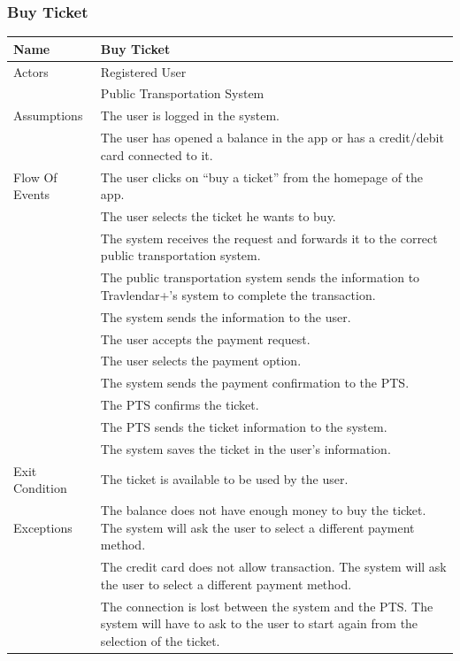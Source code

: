 \documentclass{article}
\begin{document}
\subsubsection{Buy Ticket}
\begin{center}
\begin{tabular}{| p{3cm} || p{8cm} |}
\hline
Name & Buy Ticket \\ \hline
Actors & Registered User \\&Public Transportation System \\ \hline
Assumptions &The user is logged in the system.\\&The user has opened a balance in the app or has a credit/debit card connected to it. \\ \hline
Flow Of Events &The user clicks on “buy a ticket” from the homepage of the app.\\&
The user selects the ticket he wants to buy.\\&
The system receives the request and forwards it to the correct public transportation system.\\&
The public transportation system sends the information to Travlendar+’s system to complete the transaction.\\&
The system sends the information to the user.\\&
The user accepts the payment request.\\&
The user selects the payment option.\\&
The system sends the payment confirmation to the PTS.\\&
The PTS confirms the ticket.\\&
The PTS sends the ticket information to the system.\\&
The system saves the ticket in the user’s information. \\ \hline
Exit Condition &The ticket is available to be used by the user. \\ \hline
Exceptions &The balance does not have enough money to buy the ticket. The system will ask the user to select a different payment method.\\&
The credit card does not allow transaction. The system will ask the user to select a different payment method. \\&
The connection is lost between the system and the PTS. The system will have to ask to the user to start again from the selection of the ticket.
 \\
\hline
\end{tabular}
\end{center}
\end{document}

